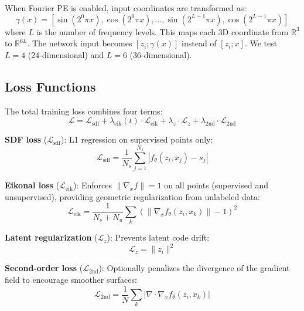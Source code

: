 \documentclass[conference]{IEEEtran}
\begin{document}
When Fourier PE is enabled, input coordinates are transformed as:
\begin{equation}
    \gamma(x) = \left[\sin(2^0 \pi x), \cos(2^0 \pi x), \ldots, \sin(2^{L-1} \pi x), \cos(2^{L-1} \pi x)\right]
\end{equation}
where $L$ is the number of frequency levels. This maps each 3D coordinate from $\mathbb{R}^3$ to $\mathbb{R}^{6L}$. The network input becomes $[z_i; \gamma(x)]$ instead of $[z_i; x]$. We test $L=4$ (24-dimensional) and $L=6$ (36-dimensional).

\subsection{Loss Functions}

The total training loss combines four terms:
\begin{equation}
    \mathcal{L} = \mathcal{L}_{\text{sdf}} + \lambda_{\text{eik}}(t) \cdot \mathcal{L}_{\text{eik}} + \lambda_z \cdot \mathcal{L}_z + \lambda_{\text{2nd}} \cdot \mathcal{L}_{\text{2nd}}
\end{equation}

\textbf{SDF loss} ($\mathcal{L}_{\text{sdf}}$): L1 regression on supervised points only:
\begin{equation}
    \mathcal{L}_{\text{sdf}} = \frac{1}{N_s} \sum_{j=1}^{N_s} |f_\theta(z_i, x_j) - s_j|
\end{equation}

\textbf{Eikonal loss} ($\mathcal{L}_{\text{eik}}$): Enforces $\|\nabla_x f\| = 1$ on all points (supervised and unsupervised), providing geometric regularization from unlabeled data:
\begin{equation}
    \mathcal{L}_{\text{eik}} = \frac{1}{N_s + N_u} \sum_{k} \left(\|\nabla_x f_\theta(z_i, x_k)\| - 1\right)^2
\end{equation}

\textbf{Latent regularization} ($\mathcal{L}_z$): Prevents latent code drift:
\begin{equation}
    \mathcal{L}_z = \|z_i\|^2
\end{equation}

\textbf{Second-order loss} ($\mathcal{L}_{\text{2nd}}$): Optionally penalizes the divergence of the gradient field to encourage smoother surfaces:
\begin{equation}
    \mathcal{L}_{\text{2nd}} = \frac{1}{N} \sum_k |\nabla \cdot \nabla_x f_\theta(z_i, x_k)|
\end{equation}
\end{document}
